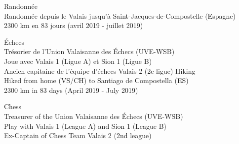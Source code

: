 \ifFrench
  \normalsize
  \color{deepgray}
  Randonnée \\
  \color{mediumgray} \small
  Randonnée depuis le Valais jusqu'à Saint-Jacques-de-Compostelle (Espagne) \\
  2300 km en 83 jours (avril 2019 - juillet 2019)
  

  \color{deepgray}
  \normalsize
  Échecs \\
  \color{mediumgray} \small
  Trésorier de l'Union Valaisanne des Échecs (UVE-WSB) \\
  Joue avec Valais 1 (Ligue A) et Sion 1 (Ligue B) \\
  Ancien capitaine de l'équipe d'échecs Valais 2 (2e ligue)
\else
  \normalsize
  \color{deepgray}
  Hiking \\
  \color{mediumgray} \small
  Hiked from home (VS/CH) to Santiago de Compostella (ES) \\
  2300 km in 83 days (April 2019 - July 2019)
  

  \color{deepgray}
  \normalsize
  Chess \\
  \color{mediumgray} \small
  Treasurer of the Union Valaisanne des Échecs (UVE-WSB) \\
  Play with Valais 1 (League A) and Sion 1 (League B) \\
  Ex-Captain of Chess Team Valais 2 (2nd league)
\fi
